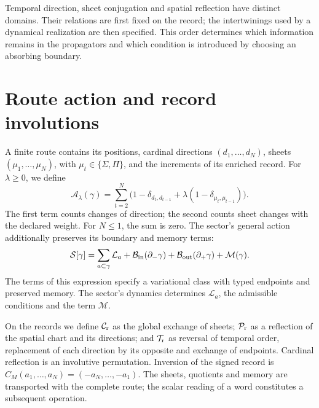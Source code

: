 Temporal direction, sheet conjugation and spatial reflection
have distinct domains. Their relations are first fixed on the record;
the intertwinings used by a dynamical realization are then
specified. This order determines which information remains in the propagators
and which condition is introduced by choosing an absorbing boundary.

\section{Route action and record involutions}
\label{x_reciprocidad:vii:subsec:accion-bidireccional}

A finite route contains its positions, cardinal directions
\((d_1,\ldots,d_N)\), sheets \((\mu_1,\ldots,\mu_N)\), with
\(\mu_t\in\{\Sigma,\Pi\}\), and the increments of its enriched
record. For \(\lambda\geq0\), we define
\begin{equation}
 \mathcal A_\lambda(\gamma)
 =\sum_{t=2}^N
 \bigl(1-\delta_{d_t,d_{t-1}}
       +\lambda(1-\delta_{\mu_t,\mu_{t-1}})\bigr).
 \label{x_reciprocidad:vii:eq:accion-ruta-bidireccional}
\end{equation}
The first term counts changes of direction; the second counts sheet
changes with the declared weight. For \(N\leq1\), the sum is zero.
The sector's general action additionally preserves its boundary and
memory terms:
\begin{equation}
 \mathcal S[\gamma]
 =\sum_{a\subset\gamma}\mathcal L_a
  +\mathcal B_{\rm in}(\partial_-\gamma)
  +\mathcal B_{\rm out}(\partial_+\gamma)
  +\mathcal M(\gamma).
 \label{x_reciprocidad:vii:eq:accion-enriquecida-frontera}
\end{equation}
The terms of this expression specify a variational class with
typed endpoints and preserved memory. The sector's dynamics determines
\(\mathcal L_a\), the admissible conditions and the term \(\mathcal M\).

On the records we define \(\mathcal C_{\rm r}\) as the global
exchange of sheets; \(\mathcal P_{\rm r}\) as a reflection of the spatial
chart and its directions; and \(\mathcal T_{\rm r}\) as reversal
of temporal order, replacement of each direction by its opposite and
exchange of endpoints. Cardinal reflection is an involutive permutation.
Inversion of the signed record is
\(C_M(a_1,\ldots,a_N)=(-a_N,\ldots,-a_1)\).
The sheets, quotients and memory are transported with the complete route;
the scalar reading of a word constitutes a subsequent operation.


